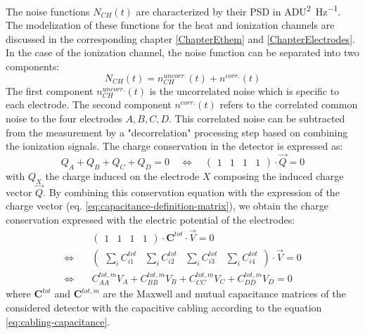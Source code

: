 The noise functions $N_{CH}(t)$ are characterized by their PSD in \si{\textsf{ADU}^2\per\Hz}. The modelization of these functions for the heat and ionization channels are discussed in the corresponding chapter \ref{ChapterEthem} and \ref{ChapterElectrodes}. In the case of the ionization channel, the noise function can be separated into two components:
\begin{equation}
\label{eq:noise-corr}
N_{CH}(t) = n_{CH}^{uncorr.}(t) + n^{corr.}(t)
\end{equation}
The first component $n_{CH}^{uncorr.}(t)$ is the uncorrelated noise which is specific to each electrode. The second component $n^{corr.}(t)$ refers to the correlated common noise to the four electrodes $A,B,C,D$. This correlated noise can be subtracted from the measurement by a "decorrelation" processing step based on combining the ionization signals.
The charge conservation in the detector is expressed as:
\begin{equation}
\label{eq:charge-conservation}
Q_A + Q_B + Q_C + Q_D = 0
\quad \Leftrightarrow \quad
\begin{pmatrix}
1 & 1 & 1 & 1
\end{pmatrix}
\cdot \vec{Q} = 0
\end{equation}
 with $Q_X$ the charge induced on the electrode $X$ composing the induced charge vector $\vec{Q}$. By combining this conservation equation with the expression of the charge vector (eq. \ref{eq:capacitance-definition-matrix}), we obtain the charge conservation expressed with the electric potential of the electrodes:
\begin{equation}
\begin{split}
& \begin{pmatrix}
1 & 1 & 1 & 1
\end{pmatrix} \cdot 
\bm{C}^{tot} \cdot \vec{V} = 0 \\
\Leftrightarrow \quad & 
\begin{pmatrix}
\sum_i C_{i1}^{tot} & \sum_i C_{i2}^{tot} & \sum_i C_{i3}^{tot} & \sum_i C_{i4}^{tot}
\end{pmatrix}
\cdot \vec{V} = 0 \\
\Leftrightarrow \quad &
C_{AA}^{tot, m} V_A + C_{BB}^{tot, m} V_B + C_{CC}^{tot, m} V_C + C_{DD}^{tot, m} V_D = 0
\end{split}
\end{equation}
where $\bm{C}^{tot}$ and $\bm{C}^{tot, m}$ are the Maxwell and mutual capacitance matrices of the considered detector with the capacitive cabling according to the equation \ref{eq:cabling-capacitance}.
